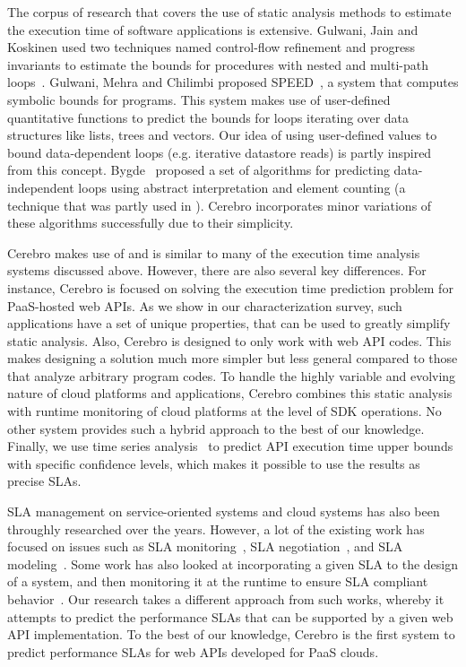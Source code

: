 The corpus of research that covers the use of static analysis methods 
to estimate the execution time of software applications is 
extensive. Gulwani, Jain and Koskinen used two techniques named control-flow
 refinement and progress invariants to estimate the bounds for procedures with nested and multi-path loops~\cite{Gulwani:2009:CRP:1542476.1542518}.
 Gulwani, Mehra and Chilimbi proposed SPEED~\cite{Gulwani:2009:SPE:1480881.1480898}, a system that computes symbolic bounds for programs. This
 system makes use of user-defined quantitative functions to predict the bounds for loops iterating over
data structures like lists, trees and vectors. Our idea of using user-defined values to bound
 data-dependent loops (e.g. iterative datastore reads) is partly inspired from this concept.
 Bygde~\cite{bygde2010static} proposed a set of algorithms for predicting data-independent loops using abstract interpretation
 and element counting (a technique that was partly used in \cite{ermedahl2007loop}). 
Cerebro incorporates minor variations of these algorithms successfully due to their
simplicity.  
 
Cerebro makes use of and is similar to many of the execution time analysis 
systems discussed above.  However, there are also several key differences. 
For instance, Cerebro is focused on solving the
execution time prediction problem for PaaS-hosted web APIs. 
As we show in our characterization survey, such applications 
have a set of unique properties, that can be used to greatly simplify static analysis.
Also, Cerebro is designed to only work with web API codes. This makes designing 
a solution much more simpler but less general compared to those that analyze
arbitrary program codes.
To handle the highly variable and evolving nature of
cloud platforms and applications, Cerebro combines this static analysis with runtime
monitoring of cloud platforms at the level of SDK operations. No other 
system provides such a hybrid approach to the best of our knowledge. 
Finally,
we use time series analysis~\cite{Nurmi:2007:QQB:1791551.1791556} 
to predict API execution time upper bounds with specific confidence
levels, which makes it possible to use the results as precise SLAs.

SLA management on service-oriented systems and cloud systems has also been 
throughly researched
over the years. However, a lot of the existing work has focused on issues 
such as SLA monitoring~\cite{Michlmayr:2009:CQM:1657755.1657756,Tripathy:2011:MMS:1980822.1980832,Raimondi:2008:EOM:1453101.1453125,Bertolino:2007:SUS:1294904.1294914}, SLA negotiation~\cite{Mahbub:2011:PSN:2061042.2062022,Yaqub:2014:ONS:2680847.2681496,6546098}, and SLA modeling~\cite{Chau:2008:ASM:1463788.1463802,Stamou:2013:SGM:2516588.2516592,Skene:2004:PSL:998675.999422}. 
Some work has also looked at incorporating a given SLA to the design of a system, and
then monitoring it at the runtime to ensure SLA compliant behavior~\cite{He:2013:TSC:2532443.2532449}. 
Our research takes a
different approach from such works, whereby it attempts to predict the performance SLAs that can be 
supported by a given web API implementation. To the best of our knowledge, Cerebro is the first system to predict performance SLAs for web APIs developed for PaaS clouds.

